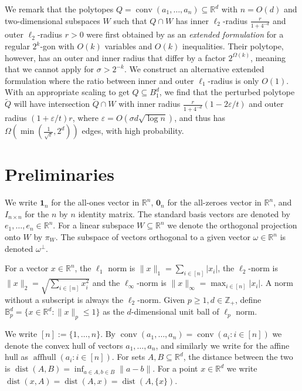 \documentclass{article}\usepackage[a4paper,margin=20mm]{geometry}
\newcommand{\R}{\mathbb R}
\newcommand{\Z}{\mathbb Z}
\newcommand{\aff}{\operatorname{affhull}}
\renewcommand{\epsilon}{\varepsilon} %
\newcommand{\conv}{\operatorname{conv}}
\newcommand{\dist}{\operatorname{dist}}
\renewcommand{\subset}{\subseteq}
\begin{document}
We remark that the polytopes $Q = \conv(a_1,\dots,a_n) \subset \R^d$ with $n = O(d)$ and two-dimensional subspaces $W$
such that $Q \cap W$ has inner $\ell_2$-radius $\frac{r}{1+4^{-d}}$ and outer $\ell_2$-radius $r > 0$
were first obtained by \cite{BN01} as an \emph{extended formulation} for
a regular $2^k$-gon with $O(k)$ variables and $O(k)$ inequalities.
Their polytope, however, has an outer and inner radius that differ by a factor $2^{\Omega(k)}$,
meaning that we cannot apply  for $\sigma > 2^{-k}$.
We construct an alternative extended formulation where the ratio between
inner and outer $\ell_1$-radius is only $O(1)$.
With an appropriate scaling to get $Q \subset B_1^d$,
we find that the perturbed polytope $\tilde Q$ will have intersection
$\tilde Q \cap W$ with inner radius $\frac{r}{1+4^{-d}}(1-2\epsilon/t)$ and outer radius $(1+\epsilon/t)r$,
where $\epsilon = O(\sigma d \sqrt{\log n})$, and thus has
$\Omega(\min(\frac{1}{\sqrt \epsilon},2^d))$ edges,
with high probability.




\section{Preliminaries}
We write $\mathbf 1_n$ for the all-ones vector in $\R^n$, $\mathbf 0_n$ for the all-zeroes vector in $\R^n$,
and $I_{n \times n}$ for the $n$ by $n$ identity matrix. The standard basis vectors are denoted by $e_1,\dots,e_n \in \R^n$.
For a linear subspace $W \subset \R^n$ we denote the orthogonal projection onto $W$ by $\pi_W$.
The subspace of vectors orthogonal to a given vector $\omega \in \R^n$ is denoted $\omega^\perp$.

For a vector $x \in \R^n$, the $\ell_1$ norm is $\|x\|_1 = \sum_{i\in[n]} |x_i|$, the $\ell_2$-norm is $\|x\|_2 = \sqrt{\sum_{i\in[n]} x_i^2}$
and the $\ell_\infty$-norm is $\|x\|_\infty = \max_{i\in[n]} |x_i|$.
A norm without a subscript is always the $\ell_2$-norm.
Given $p \geq 1, d \in \Z_+$, define $\mathbb{B}_p^d = \{x \in \R^d : \|x\|_p \leq 1\}$ as the $d$-dimensional unit ball of $\ell_p$ norm.

We write $[n] := \{1,\dots,n\}$. By $\conv(a_1,\dots,a_n) = \conv(a_i : i \in [n])$ we denote the convex hull of vectors $a_1,\dots,a_n$,
and similarly we write for the affine hull as $\aff(a_i : i \in [n])$.
For sets $A, B \subset \R^d$, the distance between the two is
$\dist(A, B) = \inf_{a \in A, b \in B} \|a-b\|$.
For a point $x \in \R^d$ we write $\dist(x, A) = \dist(A, x) = \dist(A, \{x\})$.
\end{document}
